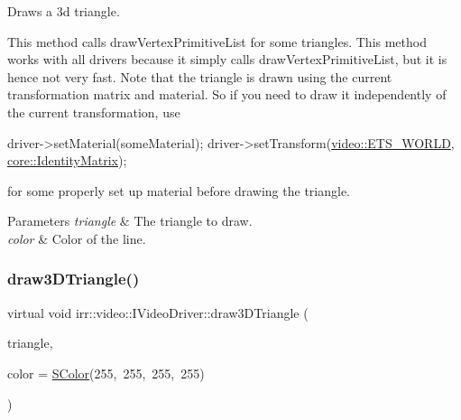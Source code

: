 Draws a 3d triangle. 

This method calls draw\+Vertex\+Primitive\+List for some triangles. This method works with all drivers because it simply calls draw\+Vertex\+Primitive\+List, but it is hence not very fast. Note that the triangle is drawn using the current transformation matrix and material. So if you need to draw it independently of the current transformation, use 
\begin{DoxyCode}
driver->setMaterial(someMaterial);
driver->setTransform(\hyperlink{namespaceirr_1_1video_a15b57657a320243be03ae6f66fcff43daf0d9765331daace35b8443c471738305}{video::ETS\_WORLD}, \hyperlink{namespaceirr_1_1core_ac4561f3920d3fbfbfff74c9bed1f2713}{core::IdentityMatrix});
\end{DoxyCode}
 for some properly set up material before drawing the triangle. 
\begin{DoxyParams}{Parameters}
{\em triangle} & The triangle to draw. \\
\hline
{\em color} & Color of the line. \\
\hline
\end{DoxyParams}
\mbox{\label{classirr_1_1video_1_1IVideoDriver_ac5eb03a333a43d17278dad31be19efca}} 
\subsubsection{\texorpdfstring{draw3\+D\+Triangle()}{draw3DTriangle()}\hspace{0.1cm}{\footnotesize\ttfamily [2/2]}}
{\footnotesize\ttfamily virtual void irr\+::video\+::\+I\+Video\+Driver\+::draw3\+D\+Triangle (\begin{DoxyParamCaption}\item[{const \hyperlink{namespaceirr_1_1core_a8983bda2678a7a67d97bf3c7be6c31c7}{core\+::triangle3df} \&}]{triangle,  }\item[{\hyperlink{classirr_1_1video_1_1SColor}{S\+Color}}]{color = {\ttfamily \hyperlink{classirr_1_1video_1_1SColor}{S\+Color}(255,~255,~255,~255)} }\end{DoxyParamCaption})\hspace{0.3cm}{\ttfamily [pure virtual]}}



